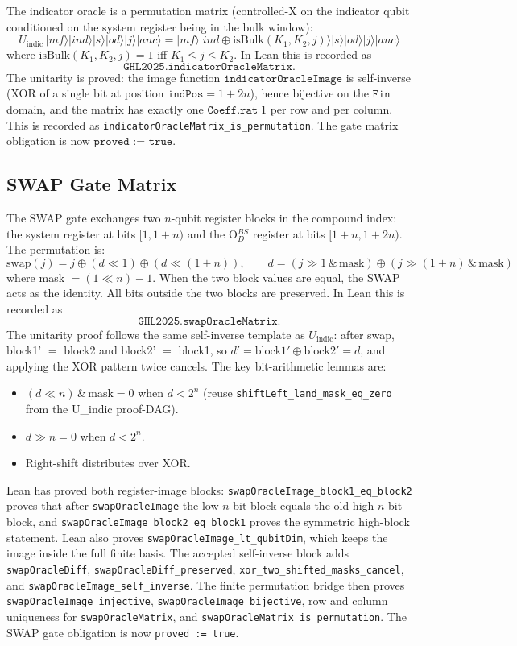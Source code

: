 The indicator oracle is a permutation matrix (controlled-X on the indicator
qubit conditioned on the system register being in the bulk window):
\[
  U_{\mathrm{indic}} \,|\mathit{mf}\rangle|ind\rangle|s\rangle|od\rangle|j\rangle|anc\rangle
  =
  |\mathit{mf}\rangle|ind \oplus \mathrm{isBulk}(K_1,K_2,j)\rangle|s\rangle|od\rangle|j\rangle|anc\rangle
\]
where $\mathrm{isBulk}(K_1,K_2,j) = 1$ iff $K_1 \leq j \leq K_2$.
In Lean this is recorded as
\[
  \texttt{GHL2025.indicatorOracleMatrix}.
\]
The unitarity is proved: the image function
$\texttt{indicatorOracleImage}$ is self-inverse (XOR of a single bit
at position $\texttt{indPos} = 1 + 2n$), hence bijective on the
$\texttt{Fin}$ domain, and the matrix has exactly one $\texttt{Coeff.rat}\;1$
per row and per column.  This is recorded as
\texttt{indicatorOracleMatrix\_is\_permutation}.  The gate matrix
obligation is now $\texttt{proved := true}$.

\subsection{SWAP Gate Matrix}

The SWAP gate exchanges two $n$-qubit register blocks in the compound index:
the system register at bits $[1, 1+n)$ and the O$_D^{BS}$ register at bits $[1+n, 1+2n)$.
The permutation is:
\[
  \mathrm{swap}(j) = j \oplus (d \ll 1) \oplus (d \ll (1+n)),
  \qquad
  d = (j \gg 1 \,\&\, \text{mask}) \oplus (j \gg (1{+}n) \,\&\, \text{mask})
\]
where mask $= (1 \ll n) - 1$.
When the two block values are equal, the SWAP acts as the identity.
All bits outside the two blocks are preserved.
In Lean this is recorded as
\[
  \texttt{GHL2025.swapOracleMatrix}.
\]
The unitarity proof follows the same self-inverse template as $U_{\mathrm{indic}}$:
after swap, block1' $=$ block2 and block2' $=$ block1, so
$d' = \text{block1}' \oplus \text{block2}' = d$, and applying the XOR pattern
twice cancels.  The key bit-arithmetic lemmas are:
\begin{itemize}
  \item $(d \ll n) \,\&\, \text{mask} = 0$ when $d < 2^n$
    (reuse \texttt{shiftLeft\_land\_mask\_eq\_zero} from the U\_indic proof-DAG).
  \item $d \gg n = 0$ when $d < 2^n$.
  \item Right-shift distributes over XOR.
\end{itemize}
Lean has proved both register-image blocks:
\texttt{swapOracleImage\_block1\_eq\_block2} proves that after
\texttt{swapOracleImage} the low $n$-bit block equals the old high $n$-bit
block, and \texttt{swapOracleImage\_block2\_eq\_block1} proves the symmetric
high-block statement.  Lean also proves
\texttt{swapOracleImage\_lt\_qubitDim}, which keeps the image inside the full
finite basis.  The accepted self-inverse block adds
\texttt{swapOracleDiff}, \texttt{swapOracleDiff\_preserved},
\texttt{xor\_two\_shifted\_masks\_cancel}, and
\texttt{swapOracleImage\_self\_inverse}.  The finite permutation bridge then
proves \texttt{swapOracleImage\_injective},
\texttt{swapOracleImage\_bijective}, row and column uniqueness for
\texttt{swapOracleMatrix}, and \texttt{swapOracleMatrix\_is\_permutation}.
The SWAP gate obligation is now \texttt{proved := true}.

